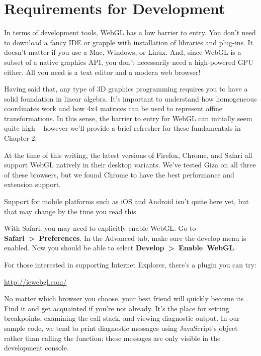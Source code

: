 
\section{Requirements for Development}

In terms of development tools, WebGL has a low barrier to entry. You don't need to download a fancy IDE or grapple with installation of libraries and plug-ins.  It doesn't matter if you use a Mac, Windows, or Linux.  And, since WebGL is a subset of a native graphics API, you don't necessarily need a high-powered GPU either.  All you need is a text editor and a modern web browser!

Having said that, any type of 3D graphics programming requires you to have a solid foundation in linear algebra.  It's important to understand how homogeneous coordinates work and how 4x4 matrices can be used to represent  affine transformations.  In this sense, the barrier to entry for WebGL can initially seem quite high -- however we'll provide a brief refresher for these fundamentals in Chapter 2.

At the time of this writing, the latest versions of Firefox, Chrome, and Safari all support WebGL natively in their desktop variants.  We've tested Giza on all three of these browsers, but we found Chrome to have the best performance and extension support.

Support for mobile platforms such as iOS and Android isn't quite here  yet, but that may change by the time you read this.

With Safari, you may need to explicitly enable WebGL.  Go to \textbf{Safari~>~Preferences}.  In the Advanced tab, make sure the develop menu is enabled.  Now you should be able to select \textbf{Develop~>~Enable~WebGL}.

For those interested in supporting Internet Explorer, there's a plugin you can try:

\url{http://iewebgl.com/}

No matter which browser you choose, your best friend will quickly become its .  Find it and get acquainted if you're not already.  It's the place for setting breakpoints, examining the call stack, and viewing diagnostic output.  In our sample code, we tend to print diagnostic messages using JavaScript's  object rather than calling the  function; these messages are only visible in the development console.

